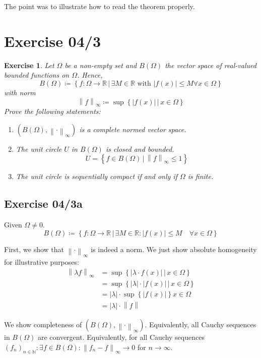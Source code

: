 \documentclass{article}
\newtheorem{ex}{Exercise} %
\newcommand{\set}[1]{\left\{#1\right\}}
\newcommand{\setdef}[2]{\left\{\left.#1\,\right|\,#2\right\}}
\newcommand{\norm}[1]{\left\|#1\right\|}
\newcommand{\card}[1]{\left|#1\right|}
\begin{document}
The point was to illustrate how to read the theorem properly.

\section{Exercise 04/3}
\begin{ex}
  Let $\Omega$ be a non-empty set and $B(\Omega)$ the vector space of real-valued bounded functions on $\Omega$.
  Hence,
  \[ B(\Omega) \coloneqq \setdef{f: \Omega \to \mathbb R}{\exists M \in \mathbb R \text{ with } \card{f(x)} \leq M \forall x \in \Omega} \]
  with norm
  \[ \norm{f}_{\infty} \coloneqq \sup\setdef{\card{f(x)}}{x \in \Omega} \]
  Prove the following statements:
  \begin{enumerate}
    \item $(B(\Omega), \norm{\cdot}_{\infty})$ is a complete normed vector space.
    \item The unit circle $U$ in $B(\Omega)$ is closed and bounded.
      \[ U = \setdef{f \in B(\Omega)}{\norm{f}_{\infty} \leq 1} \]
    \item The unit circle is sequentially compact if and only if $\Omega$ is finite.
  \end{enumerate}
\end{ex}

\subsection{Exercise 04/3a}
Given $\Omega \neq 0$.
\[ B(\Omega) \coloneqq \setdef{f: \Omega \to \mathbb R}{\exists M \in \mathbb R: \card{f(x)} \leq M \quad \forall x \in \Omega} \]

First, we show that $\norm{\cdot}_{\infty}$ is indeed a norm. We just show absolute homogeneity for illustrative purposes:
\begin{align*}
  \norm{\lambda f}_{\infty}
    &= \sup\setdef{\card{\lambda \cdot f(x)}}{x \in \Omega} \\
    &= \sup\setdef{\card{\lambda} \cdot \card{f(x)}}{x \in \Omega} \\
    &= \card{\lambda} \cdot \sup\set{\card{f(x)}}{x \in \Omega} \\
    &= \card{\lambda} \cdot \norm{f}
\end{align*}

We show completeness of $(B(\Omega), \norm{\cdot}_{\infty})$.
Equivalently, all Cauchy sequences in $B(\Omega)$ are convergent.
Equivalently, for all Cauchy sequences $(f_n)_{n \in \mathbb N}: \exists f \in B(\Omega): \norm{f_n - f}_{\infty} \to 0$ for $n \to \infty$.
\end{document}
